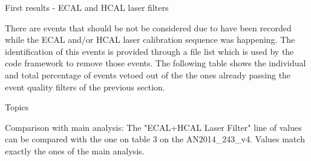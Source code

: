 \documentclass[8pt]{beamer}
\begin{document}
\begin{frame}{First results - ECAL and HCAL laser  filters}

There are events that should be not be considered due to have been recorded while the ECAL and/or HCAL laser calibration sequence was happening. The identification of this events is provided through a file list which is used by the code framework to remove those events. The following table shows the individual and total percentage of events vetoed out of the the ones already passing the event quality filters of the previous section.

\begin{block}{Topics}


\end{block}

\begin{block}{Comparison with main analysis:}
The "ECAL+HCAL Laser Filter" line of values can be compared with the one on  table 3 on the AN2014\_243\_v4. Values match exactly the ones of the main analysis.
\end{block}

\end{frame}
\end{document}
